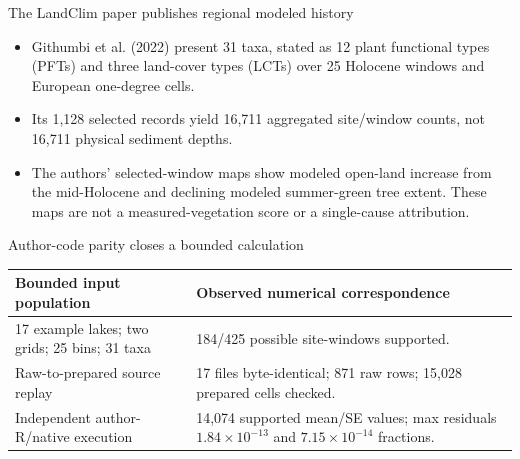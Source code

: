 \begin{frame}{The LandClim paper publishes regional modeled history}
\small
\begin{itemize}
\item Githumbi et al. (2022) present 31 taxa, stated as 12 plant functional types (PFTs) and three land-cover types (LCTs) over 25 Holocene windows and European one-degree cells.
\item Its 1,128 selected records yield 16,711 aggregated site/window counts, not 16,711 physical sediment depths.
\item The authors' selected-window maps show modeled open-land increase from the mid-Holocene and declining modeled summer-green tree extent. These maps are not a measured-vegetation score or a single-cause attribution.
\end{itemize}
\end{frame}

\begin{frame}{Author-code parity closes a bounded calculation}
\small
\begin{tabular}{p{}p{}}
\toprule
Bounded input population & Observed numerical correspondence \\
\midrule
17 example lakes; two grids; 25 bins; 31 taxa & 184/425 possible site-windows supported. \\
Raw-to-prepared source replay & 17 files byte-identical; 871 raw rows; 15,028 prepared cells checked. \\
Independent author-R/native execution & 14,074 supported mean/SE values; max residuals $1.84\times10^{-13}$ and $7.15\times10^{-14}$ fractions. \\
\bottomrule
\end{tabular}
\end{frame}

